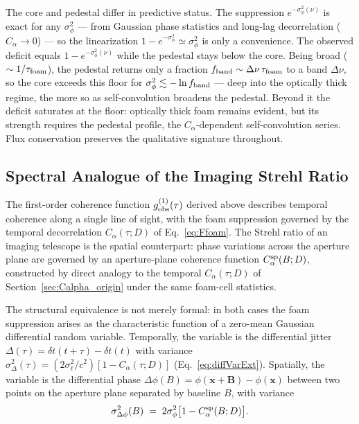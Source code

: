 \documentclass[aps,prd,onecolumn,amsmath,amssymb]{revtex4-2}
\begin{document}
The core and pedestal differ in predictive status.  The suppression
$e^{-\sigma_\phi^2(\nu)}$ is exact for any $\sigma_\phi^2$ --- from
Gaussian phase statistics and long-lag decorrelation ($C_\alpha\to0$) ---
so the linearization $1-e^{-\sigma_\phi^2}\simeq\sigma_\phi^2$ is only a
convenience.  The observed deficit equals $1-e^{-\sigma_\phi^2(\nu)}$
while the pedestal stays below the core.  Being broad
($\sim1/\tau_{\rm foam}$), the pedestal returns only a fraction
$f_{\rm band}\sim\Delta\nu\,\tau_{\rm foam}$ to a band $\Delta\nu$, so the
core exceeds this floor for $\sigma_\phi^2\lesssim-\ln f_{\rm band}$ ---
deep into the optically thick regime, the more so as self-convolution
broadens the pedestal.  Beyond it the deficit saturates at the floor:
optically thick foam remains evident, but its strength requires the
pedestal profile, the $C_\alpha$-dependent self-convolution series.
Flux conservation preserves the qualitative signature throughout.


\subsection{\texorpdfstring{Spectral Analogue of}{Spectral Analogue of} the Imaging Strehl Ratio}
\label{sec:connection}

The first-order coherence function $g^{(1)}_{\rm obs}(\tau)$ derived
above describes temporal coherence along a single line of
sight, with the foam suppression governed by the temporal
decorrelation $C_\alpha(\tau;D)$ of Eq.~\eqref{eq:Ffoam}.  The Strehl
ratio of an imaging telescope is the spatial counterpart:
phase variations across the aperture plane are governed by an
aperture-plane coherence function $C_\alpha^{\rm sp}(B;D)$, constructed
by direct analogy to the temporal $C_\alpha(\tau;D)$ of
Section~\ref{sec:Calpha_origin} under the same foam-cell statistics.

The structural equivalence is not merely formal: in both cases the
foam suppression arises as the characteristic function of a zero-mean
Gaussian differential random variable.  Temporally, the variable is
the differential jitter $\Delta(\tau)=\delta t(t+\tau)-\delta t(t)$
with variance $\sigma_\Delta^2(\tau)=(2\sigma_\ell^2/c^2)[1-C_\alpha(\tau;D)]$
(Eq.~\eqref{eq:diffVarExt}).  Spatially, the variable is the
differential phase
$\Delta\phi(B)=\phi(\mathbf{x}+\mathbf{B})-\phi(\mathbf{x})$
between two points on the aperture plane separated by baseline $B$,
with variance
\begin{equation}
  \sigma_{\Delta\phi}^2(B) \;=\; 2\sigma_\phi^2\bigl[1-C_\alpha^{\rm sp}(B;D)\bigr].
  \label{eq:dphi-variance}
\end{equation}
\end{document}

